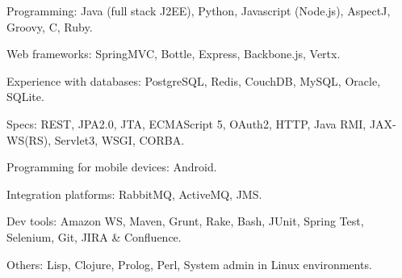 \begin{rlist}
  \item Programming: Java (full stack J2EE), Python, Javascript (Node.js),
  AspectJ, Groovy, C, Ruby.
  \item Web frameworks: SpringMVC, Bottle, Express, Backbone.js, Vertx.
  \item Experience with databases: PostgreSQL, Redis, CouchDB, MySQL, Oracle, SQLite.
  \item Specs: REST, JPA2.0, JTA, ECMAScript 5, OAuth2, HTTP,
  Java RMI, JAX-WS(RS), Servlet3, WSGI, CORBA.
  \item Programming for mobile devices: Android.
  \item Integration platforms: RabbitMQ, ActiveMQ, JMS.
  \item Dev tools: Amazon WS, Maven, Grunt, Rake, Bash, JUnit, Spring Test,
  Selenium, Git, JIRA \& Confluence.
  \item Others: Lisp, Clojure, Prolog, Perl, System admin in Linux
  environments.
\end{rlist}

